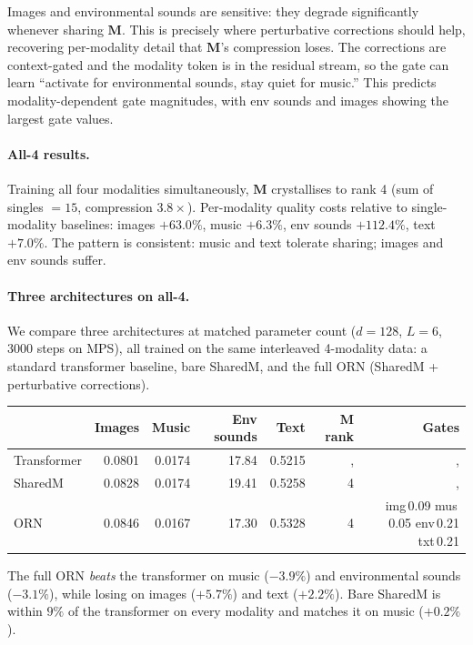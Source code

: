 \documentclass[11pt, a4paper]{article}
\newcommand{\M}{\mathbf{M}}
\theoremstyle{plain}
\theoremstyle{remark}
\begin{document}
Images and environmental sounds are sensitive: they degrade significantly whenever sharing $\M$.
This is precisely where perturbative corrections should help, recovering per-modality detail that $\M$'s compression loses.
The corrections are context-gated and the modality token is in the residual stream, so the gate can learn ``activate for environmental sounds, stay quiet for music.''
This predicts modality-dependent gate magnitudes, with env sounds and images showing the largest gate values.

\paragraph{All-4 results.}
Training all four modalities simultaneously, $\M$ crystallises to rank 4 (sum of singles $= 15$, compression $3.8\times$).
Per-modality quality costs relative to single-modality baselines: images $+63.0\%$, music $+6.3\%$, env sounds $+112.4\%$, text $+7.0\%$.
The pattern is consistent: music and text tolerate sharing; images and env sounds suffer.

\paragraph{Three architectures on all-4.}
We compare three architectures at matched parameter count ($d{=}128$, $L{=}6$, 3000 steps on MPS), all trained on the same interleaved 4-modality data: a standard transformer baseline, bare SharedM, and the full ORN (SharedM + perturbative corrections).

\begin{center}\small
\begin{tabular}{@{}lrrrrrr@{}}
\toprule
& \textbf{Images} & \textbf{Music} & \textbf{Env sounds} & \textbf{Text} & \textbf{M rank} & \textbf{Gates} \\
\midrule
Transformer & 0.0801 & 0.0174 & 17.84 & 0.5215 & ,  & ,  \\
SharedM     & 0.0828 & 0.0174 & 19.41 & 0.5258 & 4 & ,  \\
ORN         & 0.0846 & 0.0167 & 17.30 & 0.5328 & 4 & \scriptsize img\,0.09 mus\,0.05 env\,0.21 txt\,0.21 \\
\bottomrule
\end{tabular}
\end{center}

The full ORN \emph{beats} the transformer on music ($-3.9\%$) and environmental sounds ($-3.1\%$), while losing on images ($+5.7\%$) and text ($+2.2\%$).
Bare SharedM is within $9\%$ of the transformer on every modality and matches it on music ($+0.2\%$).
\end{document}
